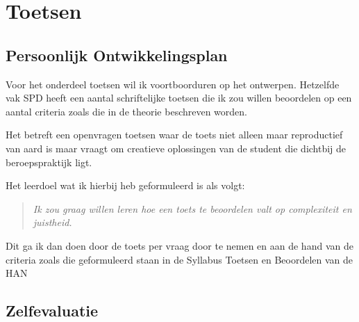 \section{Toetsen}

\subsection{Persoonlijk Ontwikkelingsplan}
Voor het onderdeel toetsen wil ik voortboorduren op het ontwerpen. Hetzelfde vak SPD heeft een aantal schriftelijke toetsen die ik zou willen beoordelen op een aantal criteria zoals die in de theorie beschreven worden.

Het betreft een openvragen toetsen waar de toets niet alleen maar reproductief van aard is maar vraagt om creatieve oplossingen van de student die dichtbij de beroepspraktijk ligt.

Het leerdoel wat ik hierbij heb geformuleerd is als volgt:
\begin{quote}
  \textit{Ik zou graag willen leren hoe een toets te beoordelen valt op complexiteit en juistheid.}
\end{quote}
Dit ga ik dan doen door de toets per vraag door te nemen en aan de hand van de criteria zoals die geformuleerd staan in de Syllabus Toetsen en Beoordelen van de HAN \cite{syllabushan}

\subsection{Zelfevaluatie}